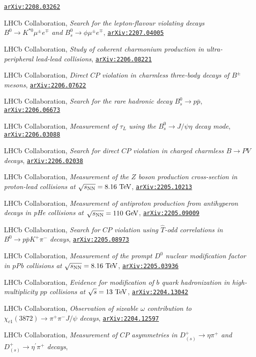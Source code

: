 \documentclass[a4paper, 11pt]{article}
\newenvironment{cvcontent}{
  \leftskip=0.5cm\rightskip=0cm
  \noindent\ignorespaces}{\par}
\newcommand{\arxiv}[1]{\href{https://arxiv.org/abs/#1}{\texttt{arXiv:#1}}}
\begin{document}
\begin{cvcontent}
\begin{enumerate}[label={[\arabic*]}, leftmargin=1.5cm]
    \arxiv{2208.03262}
    \item LHCb Collaboration,
    \emph{Search for the lepton-flavour violating decays $B^0 \to K^{*0} \mu^\pm e^\mp$ and $B_s^0 \to \phi \mu^\pm e^\mp$},
    \arxiv{2207.04005}
    \item LHCb Collaboration,
    \emph{Study of coherent charmonium production in ultra-peripheral lead-lead collisions},
    \arxiv{2206.08221}
    \sloppy
    \item LHCb Collaboration,
    \emph{Direct $CP$ violation in charmless three-body decays of $B^{\pm}$ mesons},
    \arxiv{2206.07622}
    \item LHCb Collaboration,
    \emph{Search for the rare hadronic decay $B_s^0\to p \bar{p}$},
    \arxiv{2206.06673}
    \item LHCb Collaboration,
    \emph{Measurement of $\tau_{L}$ using the $B_{s}^{0} \to J/\psi \eta$ decay mode},
    \arxiv{2206.03088}
    \item LHCb Collaboration,
    \emph{Search for direct $CP$ violation in charged charmless $B \to PV$ decays},
    \arxiv{2206.02038}
    \item LHCb Collaboration,
    \emph{Measurement of the $Z$ boson production cross-section in proton-lead collisions at $\sqrt{s_{\rm{NN}}}=8.16~\rm{TeV}$},
    \arxiv{2205.10213}
    \item LHCb Collaboration,
    \emph{Measurement of antiproton production from antihyperon decays in pHe collisions at $\sqrt{s_{\rm{NN}}}=110~\rm{GeV}$},
    \arxiv{2205.09009}
    \item LHCb Collaboration,
    \emph{Search for $CP$ violation using $\hat{T}$-odd correlations in $B^{0} \to p \bar p K^{+} \pi^{-}$ decays},
    \arxiv{2205.08973}
    \item LHCb Collaboration,
    \emph{Measurement of the prompt $D^0$ nuclear modification factor in $p$Pb collisions at $\sqrt{s_{\rm{NN}}} = 8.16~{\rm{TeV}}$},
    \arxiv{2205.03936}
    \item LHCb Collaboration,
    \emph{Evidence for modification of $b$ quark hadronization in high-multiplicity $pp$ collisions at $\sqrt{s} = 13~\rm{TeV}$},
    \arxiv{2204.13042}
    \item LHCb Collaboration,
    \emph{Observation of sizeable $\omega$ contribution to $\chi_{c1}(3872) \to \pi^+ \pi^- J/\psi$ decays},
    \arxiv{2204.12597}
    \item LHCb Collaboration,
    \emph{Measurement of $CP$ asymmetries in $D^+_{(s)}\rightarrow \eta \pi^+$ and $D^+_{(s)}\rightarrow \eta^{\prime} \pi^+$ decays},

\end{enumerate}
\end{cvcontent}
\end{document}
